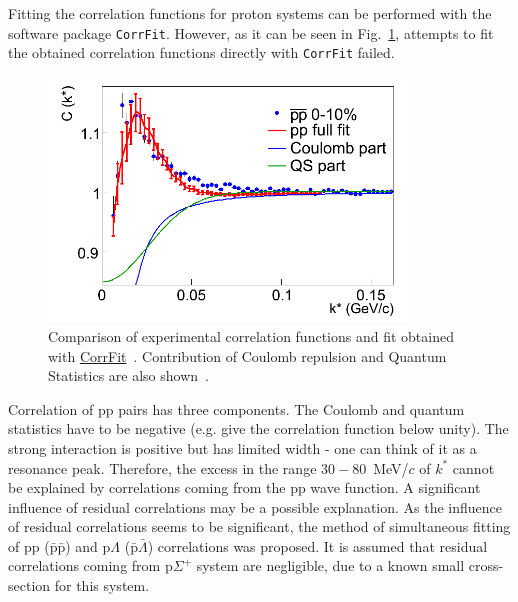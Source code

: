 Fitting the correlation functions for proton systems can be performed with the software package \verb|CorrFit|. However, as it can be seen in Fig.~\ref{compareFitCoulomb}, attempts to fit the obtained correlation functions directly with \verb|CorrFit| failed.
\begin{figure}%
  \centering
  \includegraphics[width=0.85\textwidth]{compareFitCoulomb}
  \caption{Comparison of experimental correlation functions and fit obtained with \protect\url{CorrFit}~\cite{corrfit}. Contribution of Coulomb repulsion and Quantum Statistics are also shown~\cite{LednickyDirac}.}
  \label{compareFitCoulomb}
\end{figure}
Correlation of pp pairs has three components. The Coulomb and quantum statistics have to be negative (e.g. give the correlation function below unity). The strong interaction is positive but has limited width - one can think of it as a resonance peak. Therefore, the excess in the range $30-80$~MeV/$c$ of $k^*$ cannot be explained by correlations coming from the pp wave function. A significant influence of residual correlations may be a possible explanation. As the influence of residual correlations seems to be significant, the method of simultaneous fitting of pp ($\bar{\mathrm{p}}\bar{\mathrm{p}}$) and p$\Lambda$ ($\bar{\mathrm{p}}\bar{\Lambda}$) correlations was proposed. It is assumed that residual correlations coming from p$\Sigma^+$ system are negligible, due to a known small cross-section for this system. %
